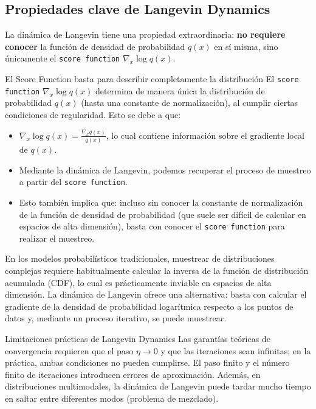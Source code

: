 \subsection{Propiedades clave de Langevin Dynamics}

La dinámica de Langevin tiene una propiedad extraordinaria: \textbf{no requiere conocer} la función de densidad de probabilidad $q(x)$ en sí misma, sino únicamente el \texttt{score function} $\nabla_x \log q(x)$.

\begin{importantbox}{El Score Function basta para describir completamente la distribución}
El \texttt{score function} $\nabla_x \log q(x)$ determina de manera única la distribución de probabilidad $q(x)$ (hasta una constante de normalización), al cumplir ciertas condiciones de regularidad. Esto se debe a que:
\begin{itemize}
    \item $\nabla_x \log q(x) = \frac{\nabla_x q(x)}{q(x)}$, lo cual contiene información sobre el gradiente local de $q(x)$.
    \item Mediante la dinámica de Langevin, podemos recuperar el proceso de muestreo a partir del \texttt{score function}.
    \item Esto también implica que: incluso sin conocer la constante de normalización de la función de densidad de probabilidad (que suele ser difícil de calcular en espacios de alta dimensión), basta con conocer el \texttt{score function} para realizar el muestreo.
\end{itemize}
\end{importantbox}

En los modelos probabilísticos tradicionales, muestrear de distribuciones complejas requiere habitualmente calcular la inversa de la función de distribución acumulada (CDF), lo cual es prácticamente inviable en espacios de alta dimensión. La dinámica de Langevin ofrece una alternativa: basta con calcular el gradiente de la densidad de probabilidad logarítmica respecto a los puntos de datos y, mediante un proceso iterativo, se puede muestrear.

\begin{warningbox}{Limitaciones prácticas de Langevin Dynamics}
Las garantías teóricas de convergencia requieren que el paso $\eta \to 0$ y que las iteraciones sean infinitas; en la práctica, ambas condiciones no pueden cumplirse. El paso finito y el número finito de iteraciones introducen errores de aproximación. Además, en distribuciones multimodales, la dinámica de Langevin puede tardar mucho tiempo en saltar entre diferentes modos (problema de mezclado).
\end{warningbox}

